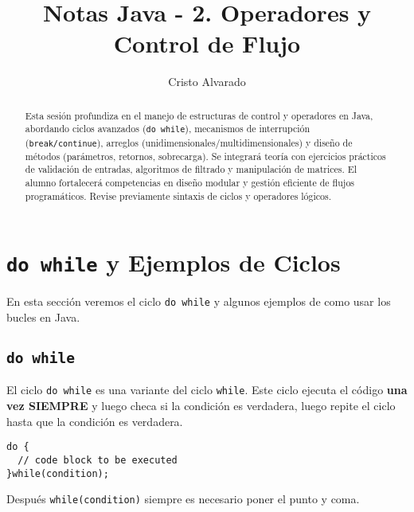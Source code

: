 \documentclass[12pt]{article}
\theoremstyle{largebreak}
\begin{document}
    \setlength{\parskip}{5pt}
    \setlength{\parindent}{12pt}
    \title{Notas Java - 2. Operadores y Control de Flujo}
    \author{Cristo Alvarado}
    \maketitle

    \begin{abstract}
        Esta sesión profundiza en el manejo de estructuras de control y operadores en Java, abordando ciclos avanzados (\texttt{do while}), mecanismos de interrupción (\texttt{break/continue}), arreglos (unidimensionales/multidimensionales) y diseño de métodos (parámetros, retornos, sobrecarga). Se integrará teoría con ejercicios prácticos de validación de entradas, algoritmos de filtrado y manipulación de matrices. El alumno fortalecerá competencias en diseño modular y gestión eficiente de flujos programáticos. Revise previamente sintaxis de ciclos y operadores lógicos.
    \end{abstract}
    
    \tableofcontents

    \lstlistoflistings

    \section{\lstinline|do while| y Ejemplos de Ciclos}

    En esta sección veremos el ciclo \lstinline|do while| y algunos ejemplos de como usar los bucles en Java.

    \subsection{\lstinline|do while|}

    El ciclo \lstinline|do while| es una variante del ciclo \lstinline|while|. Este ciclo ejecuta el código \textbf{una vez SIEMPRE} y luego checa si la condición es verdadera, luego repite el ciclo hasta que la condición es verdadera.

    \begin{lstlisting}[caption={Sintaxis \lstinline|do while|},label=DescriptiveLabel]
do {
  // code block to be executed
}while(condition);
    \end{lstlisting}

    \begin{obs}
        Después \lstinline|while(condition)| siempre es necesario poner el punto y coma.
    \end{obs}
\end{document}
